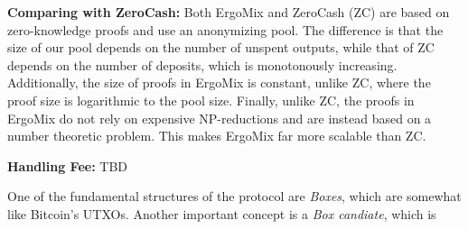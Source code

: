 \documentclass[11pt]{article}
\newcommand{\authnote}[2]{\marginpar{\parbox{\marginparwidth}{\tiny %
  \textsf{#1 {\textcolor{blue}{notes: #2}}}}}%
  \textcolor{blue}{\textbf{\dag}}}
\newcommand{\authnote}[2]{
  \textsf{#1 \textcolor{blue}{: #2}}}
\newcommand{\authnote}[2]{}
\newcommand{\snote}[1]{{\authnote{\textcolor{yellow}{Scalahub notes}}{#1}}}
\newcommand{\mixname}{ErgoMix\xspace}
\begin{document}
\textbf{Comparing with ZeroCash:} Both \mixname and ZeroCash (ZC) are based on zero-knowledge proofs and use an anonymizing pool. The difference is that the size of our pool depends on the number of unspent outputs, while that of ZC depends on the number of deposits, which is monotonously increasing. Additionally, the size of proofs in \mixname is constant, unlike ZC, where the proof size is logarithmic to the pool size. Finally, unlike ZC, the proofs in \mixname do not rely on expensive NP-reductions and are instead based on a number theoretic problem. This makes \mixname far more scalable than ZC. 

\textbf{Handling Fee:} TBD



One of the fundamental structures of the protocol are {\em Boxes}, which are somewhat like Bitcoin's UTXOs. Another important concept is a {\em Box candiate}, which is 



\end{document}
